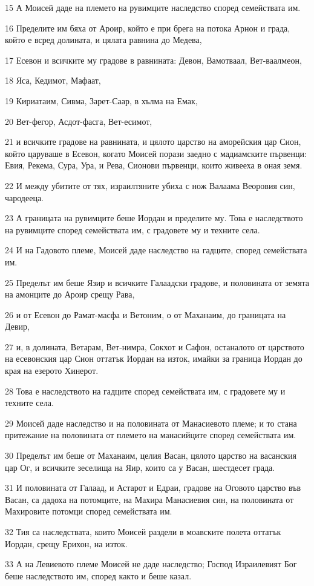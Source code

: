 \par 15 А Моисей даде на племето на рувимците наследство според семействата им.
\par 16 Пределите им бяха от Ароир, който е при брега на потока Арнон и града, който е всред долината, и цялата равнина до Медева,
\par 17 Есевон и всичките му градове в равнината: Девон, Вамотваал, Вет-ваалмеон,
\par 18 Яса, Кедимот, Мафаат,
\par 19 Кириатаим, Сивма, Зарет-Саар, в хълма на Емак,
\par 20 Вет-фегор, Асдот-фасга, Вет-есимот,
\par 21 и всичките градове на равнината, и цялото царство на аморейския цар Сион, който царуваше в Есевон, когато Моисей порази заедно с мадиамските първенци: Евия, Рекема, Сура, Ура, и Рева, Сионови първенци, които живееха в оная земя.
\par 22 И между убитите от тях, израилтяните убиха с нож Валаама Веоровия син, чародееца.
\par 23 А границата на рувимците беше Иордан и пределите му. Това е наследството на рувимците според семействата им, с градовете му и техните села.
\par 24 И на Гадовото племе, Моисей даде наследство на гадците, според семействата им.
\par 25 Пределът им беше Язир и всичките Галаадски градове, и половината от земята на амонците до Ароир срещу Рава,
\par 26 и от Есевон до Рамат-масфа и Ветоним, о от Маханаим, до границата на Девир,
\par 27 и, в долината, Ветарам, Вет-нимра, Сокхот и Сафон, останалото от царството на есевонския цар Сион оттатък Иордан на изток, имайки за граница Иордан до края на езерото Хинерот.
\par 28 Това е наследството на гадците според семействата им, с градовете му и техните села.
\par 29 Моисей даде наследство и на половината от Манасиевото племе; и то стана притежание на половината от племето на манасийците според семействата им.
\par 30 Пределът им беше от Маханаим, целия Васан, цялото царство на васанския цар Ог, и всичките зеселища на Яир, които са у Васан, шестдесет града.
\par 31 И половината от Галаад, и Астарот и Едраи, градове на Оговото царство във Васан, са дадоха на потомците, на Махира Манасиевия син, на половината от Махировите потомци според семействата им.
\par 32 Тия са наследствата, които Моисей раздели в моавските полета оттатък Иордан, срещу Ерихон, на изток.
\par 33 А на Левиевото племе Моисей не даде наследство; Господ Израилевият Бог беше наследството им, според както и беше казал.

